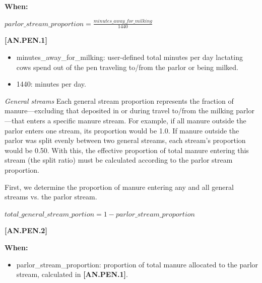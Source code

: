 \begin{refsection}
\textbf{When:}
    \begin{center}
        \(parlor\_stream\_proportion = \frac{minutes\_away\_for\_milking }{ 1440}\)
    \end{center}
        \vspace{0.5cm}
    
            {\raggedleft \textbf{[AN.PEN.1]}\par}
            \vspace{0.5cm}

    \begin{itemize}
        \item minutes\_away\_for\_milking: user-defined total minutes per day lactating cows spend out of the pen traveling to/from the parlor or being milked.
        \item 1440: minutes per day.

    \end{itemize}

\textit{General streams} Each general stream proportion represents the fraction of manure—excluding that deposited in or during travel to/from the milking parlor—that enters a specific manure stream. For example, if all manure outside the parlor enters one stream, its proportion would be 1.0. If manure outside the parlor was split evenly between two general streams, each stream’s proportion would be 0.50. With this, the effective proportion of total manure entering this stream (the split ratio) must be calculated according to the parlor stream proportion.


First, we determine the proportion of manure entering any and all general streams vs. the parlor stream.
\vspace{0.2cm}

    \begin{center}
        \(total\_general\_stream\_portion = 1 - parlor\_stream\_proportion\)
    \end{center}
        \vspace{0.5cm}
    
            {\raggedleft \textbf{[AN.PEN.2]}\par}
            \vspace{0.5cm}
            
\textbf{When:}
    \begin{itemize}
        \item parlor\_stream\_proportion: proportion of total manure allocated to the parlor stream, calculated in \textbf{[AN.PEN.1]}.
    \end{itemize}


\end{refsection}
